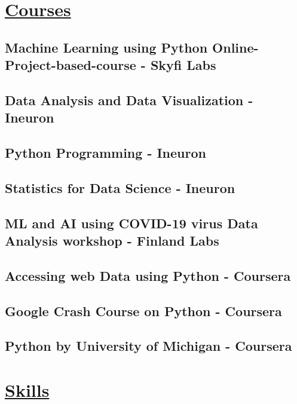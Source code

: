 \documentclass{article}
\begin{document}
\section{\underline{Courses}}


\subsection{\textbf{Machine Learning using Python Online-Project-based-course }
    \textmd{- Skyfi Labs}}

\subsection{\textbf{Data Analysis and Data Visualization}
    \textmd{- Ineuron}}

\subsection{\textbf{Python Programming}
    \textmd{- Ineuron}}

\subsection{\textbf{Statistics for Data Science}
    \textmd{- Ineuron}}

\subsection{\textbf{ML and AI using COVID-19 virus Data Analysis workshop}
    \textmd{- Finland Labs}}

\subsection{\textbf{Accessing web Data using Python}
    \textmd{- Coursera}}

\subsection{\textbf{Google Crash Course on Python}
    \textmd{- Coursera}}

\subsection{\textbf{Python by University of Michigan}
    \textmd{- Coursera}}


\section{\underline{Skills}}
\end{document}
